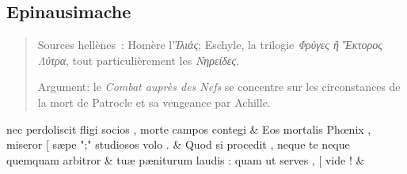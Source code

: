\documentclass[12pt,onecolumn,twoside,a4paper]{memoir}
\begin{document}
            
               \subsection*{Epinausimache}
               \begin{abstract}
                   Sources hellènes : Homère l'\textit{Ἰλιάς}; Eschyle, la
                     trilogie \textit{ Φρύγες ἢ Ἕκτορος Λύτρα}, tout
                     particulièrement les \textit{Νηρείδες}.\par
                   Argument: le \textit{Combat auprès des Nefs }se concentre sur les
                     circonstances de la mort de Patrocle et sa vengeance par Achille.\par
               \end{abstract}
               \begin{pairs}
                  \begin{Leftside}
			\beginnumbering
			\setcounter{stanzaL}{0}
                     
                         \stanza {}
                     nec
                              perdoliscit
                              fligi
                              socios
                              ,
                              morte
                              campos
                              contegi \&
                         \stanza {}
                     Eos
                              mortalis
                              Phœnix
                              ,
                              miseror
                              [
                              sæpe
                              ";"
                              studiosos
                              volo
                              . \&
                         \stanza {}Quod
                              si
                              procedit
                              ,
                              neque
                              te
                              neque
                              quemquam
                              arbitror & 
                     tuæ
                              pæniturum
                              laudis
                              :
                              quam
                              ut
                              serves
                              ,
                              [
                              vide
                              ! \&
                         \stanza {}
                     

\end{Leftside}
\end{pairs}
\end{document}
